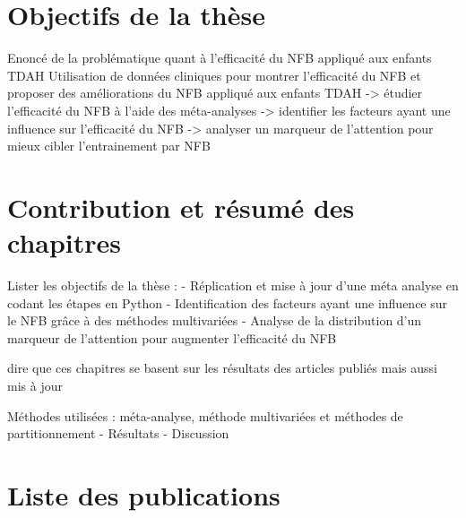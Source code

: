 \section{Objectifs de la thèse}
Enoncé de la problématique quant à l’efficacité du NFB appliqué aux enfants TDAH
Utilisation de données cliniques pour montrer l'efficacité du NFB et proposer des améliorations du NFB appliqué aux enfants TDAH
-> étudier l'efficacité du NFB à l'aide des méta-analyses
-> identifier les facteurs ayant une influence sur l'efficacité du NFB
-> analyser un marqueur de l'attention pour mieux cibler l'entrainement par NFB

\section{Contribution et résumé des chapitres}
Lister les objectifs de la thèse :
- Réplication et mise à jour d’une méta analyse en codant les étapes en Python
- Identification des facteurs ayant une influence sur le NFB grâce à des méthodes multivariées
- Analyse de la distribution d’un marqueur de l’attention pour augmenter l’efficacité du NFB

dire que ces chapitres se basent sur les résultats des articles publiés mais aussi mis à jour

Méthodes utilisées : méta-analyse, méthode multivariées et méthodes de partitionnement
- Résultats
- Discussion

\section{Liste des publications}